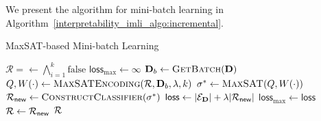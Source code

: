 We present the algorithm for mini-batch learning in Algorithm~\ref{interpretability_imli_algo:incremental}. 
\begin{algorithm}
	\caption{MaxSAT-based Mini-batch Learning}
	\label{interpretability_imli_algo:incremental}
	\begin{algorithmic}[1]
		\State $\mathcal{R} = \leftarrow \bigwedge_{i=1}^k\text{false} $ 
		\State $ \mathsf{loss}_{\max} \leftarrow \infty$ 
		 
		\State $ \mathbf{D}_b \leftarrow \textsc{GetBatch}(\mathbf{D}) $
		\State $ Q, W \! \left( \cdot \right) \leftarrow \textsc{MaxSATEncoding}({\mathcal{R}}, \mathbf{D}_b, \lambda, k) $ 
		\State $ \sigma^* \leftarrow \textsc{MaxSAT}(Q,W \! \left( \cdot \right)) $
		\State $ {\mathcal{R}}_{\mathsf{new}} \leftarrow \textsc{ConstructClassifier}(\sigma^*) $
		\State $ \mathsf{loss} \leftarrow  |\mathcal{E}_{\mathbf{D}}| +\lambda |\mathcal{R}_{\mathsf{new}}| $ 
		\State $ \mathsf{loss}_{\max} \leftarrow \mathsf{loss} $
		\State $ {\mathcal{R}} \leftarrow {\mathcal{R}}_{\mathsf{new}} $
		\EndIf
		\EndFor
		\State \Return $ {\mathcal{R}} $
		\EndFunction
	\end{algorithmic}
\end{algorithm} 	


